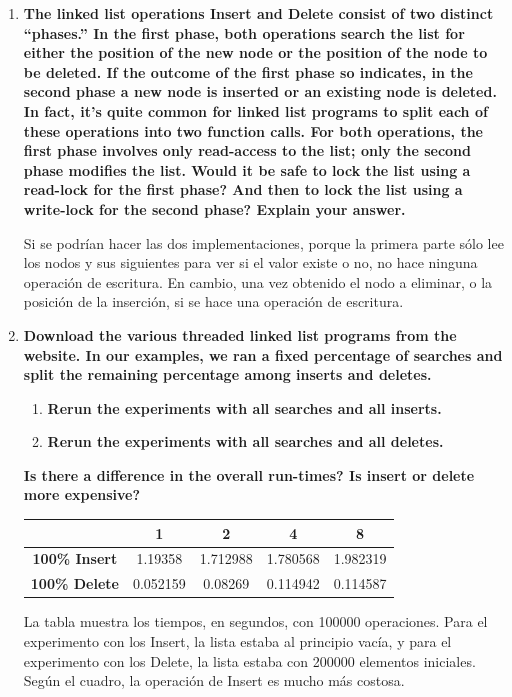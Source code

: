 \documentclass[a4paper,12pt]{article}
\begin{document}
\begin{enumerate}
\item \textbf{The linked list operations Insert and Delete consist of two distinct ``phases.'' In the first phase,
both operations search the list for either the position of the new node or the position of the node to be deleted.
If the outcome of the first phase so indicates, in the second phase a new node is inserted or an existing node is deleted.
In fact, it’s quite common for linked list programs to split each of these operations into two function calls. For both
operations, the first phase involves only read-access to the list; only the second phase modifies the list. Would it be
safe to lock the list using a read-lock for the first phase? And then to lock the list using a write-lock for the second phase?
Explain your answer.}

Si se podrían hacer las dos implementaciones, porque la primera parte sólo lee los nodos y sus siguientes para ver si
el valor existe o no, no hace ninguna operación de escritura. En cambio, una vez obtenido el nodo a eliminar, o la posición
de la inserción, si se hace una operación de escritura.

\item{ \textbf{Download the various threaded linked list programs from the website. In our examples, we ran a
fixed percentage of searches and split the remaining percentage among inserts and deletes.}
\begin{enumerate}
 \item \textbf{Rerun the experiments with all searches and all inserts.}
 \item \textbf{Rerun the experiments with all searches and all deletes.}
\end{enumerate}
\textbf{Is there a difference in the overall run-times? Is insert or delete more expensive?}
}

\begin{center}
\begin{tabular}{|c|c|c|c|c|}\hline
\textbf{} & \textbf{1} & \textbf{2} & \textbf{4} & \textbf{8}\\\hline
\textbf{100\% Insert} & 1.19358 & 1.712988 & 1.780568 & 1.982319\\\hline
\textbf{100\% Delete} & 0.052159 & 0.08269 & 0.114942 & 0.114587\\\hline
\end{tabular}
\end{center}

La tabla muestra los tiempos, en segundos, con 100000 operaciones. Para el experimento con los Insert, la lista estaba al principio
vacía, y para el experimento con los Delete, la lista estaba con 200000 elementos iniciales. Según el cuadro, la operación
de Insert es mucho más costosa.


\end{enumerate}
\end{document}
